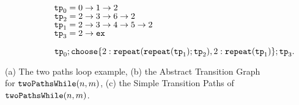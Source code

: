 {\begin{figure}
\begin{subfigure}{.71\textwidth}
\begin{subfigure}{.67\textwidth}
\begin{centering}
\begin{tikzpicture}[scale=\textwidth/20cm,samples=200]
  \end{tikzpicture}
        \caption{}
\end{centering}
\end{subfigure}
{\small
\begin{subfigure}{.3\textwidth}
\begin{centering}
        $\tpath_0 = 0 \to 1 \to 2$ \\
        $\tpath_2 = 2 \to 3 \to 6 \to 2$ \\ 
        $\tpath_1 = 2 \to 3 \to 4 \to 5 \to 2$ \\
        $\tpath_3 = 2 \to \lex$
        \caption{}
\end{centering}
\end{subfigure}
}
{\small
\begin{subfigure}{.8\textwidth}
\begin{centering}
    $
    \tpath_0 ; 
    \rpchoose{2: \rprepeat(\rprepeat(\tpath_1); \tpath_2), 
    2: \rprepeat(\tpath_1)}; \tpath_3.
    $
\end{centering}
\end{subfigure}
}
\end{subfigure}
\vspace{-0.2cm}
\caption{
    (a) The two paths loop example,
    (b) the Abstract Transition Graph for $\kw{twoPathsWhile}(n, m)$,
    (c) the Simple Transition Paths of $\kw{twoPathsWhile}(n, m)$.}
    \vspace{-0.5cm}
        \label{fig:whileTwoCounters-overview}
    \end{figure}
    }


